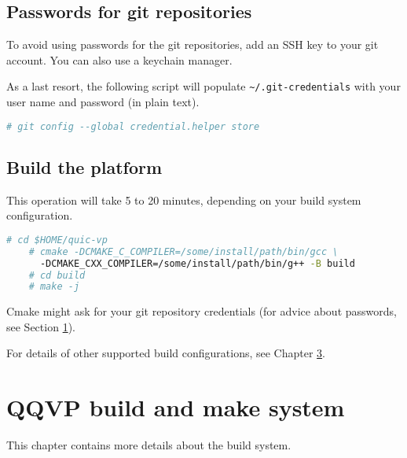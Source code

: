 \section{Passwords for git repositories}
\label{sec:passwords-git-repos}

To avoid using passwords for the git repositories, add an SSH key to your git account. You can also use a keychain manager.

As a last resort, the following script will populate {\small{\lstinline!~/.git-credentials!}} with your user name and password (in plain text).

\small
\begin{lstlisting}[language=bash]
    # git config --global credential.helper store
\end{lstlisting}
\normalsize


\section{Build the platform}

This operation will take 5 to 20 minutes, depending on your build system configuration.

\small
\begin{lstlisting}[language=bash]
    # cd $HOME/quic-vp
    # cmake -DCMAKE_C_COMPILER=/some/install/path/bin/gcc \
      -DCMAKE_CXX_COMPILER=/some/install/path/bin/g++ -B build
    # cd build
    # make -j
\end{lstlisting}
\normalsize

Cmake might ask for your git repository credentials (for advice about passwords, see Section \ref{sec:passwords-git-repos}). \vspace{6pt}

For details of other supported build configurations, see Chapter \ref{ch:gs-build-make-system}.



\chapter{QQVP build and make system}
\label{ch:gs-build-make-system}

This chapter contains more details about the build system.



